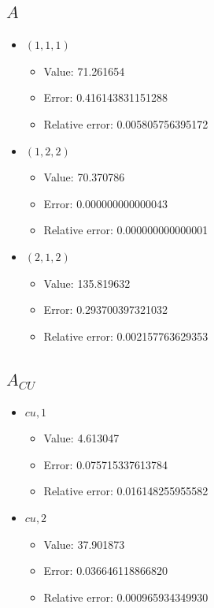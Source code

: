 \documentclass{article}%
\begin{document}
\subsection{$A$}%
\begin{itemize}%
	\item $(1, 1, 1)$%
	\begin{itemize}%
		\item Value: 71.261654%
		\item Error: 0.416143831151288%
		\item Relative error: 0.005805756395172%
	\end{itemize}%
	\item $(1, 2, 2)$%
	\begin{itemize}%
		\item Value: 70.370786%
		\item Error: 0.000000000000043%
		\item Relative error: 0.000000000000001%
	\end{itemize}%
	\item $(2, 1, 2)$%
	\begin{itemize}%
		\item Value: 135.819632%
		\item Error: 0.293700397321032%
		\item Relative error: 0.002157763629353%
	\end{itemize}%
\end{itemize}%
\subsection{$A_{CU}$}%
\begin{itemize}%
	\item $\textit{cu},1$%
	\begin{itemize}%
		\item Value: 4.613047%
		\item Error: 0.075715337613784%
		\item Relative error: 0.016148255955582%
	\end{itemize}%
	\item $\textit{cu},2$%
	\begin{itemize}%
		\item Value: 37.901873%
		\item Error: 0.036646118866820%
		\item Relative error: 0.000965934349930%
	\end{itemize}%
\end{itemize}%
\end{document}
